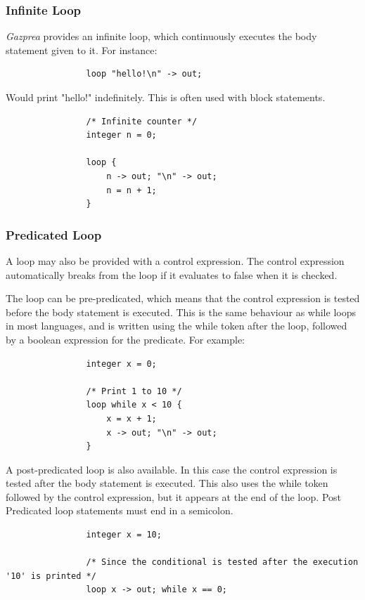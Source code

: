 \documentclass{article}
\begin{document}
		\subsubsection{Infinite Loop}\label{sec:infLoop}
			\textit{Gazprea} provides an infinite loop, which continuously executes the body statement given to it. For
			instance:

			\begin{lstlisting}
				loop "hello!\n" -> out;
			\end{lstlisting}

			Would print "hello!" indefinitely. This is often used with block statements.

			\begin{lstlisting}
				/* Infinite counter */
				integer n = 0;

				loop {
					n -> out; "\n" -> out;
					n = n + 1;
				}
			\end{lstlisting}

		\subsubsection{Predicated Loop}\label{sec:predicatedLoop}

			A loop may also be provided with a control expression. The control expression automatically breaks from the
			loop if it evaluates to false when it is checked.

			The loop can be pre-predicated, which means that the control expression is tested before the body statement
			is executed. This is the same behaviour as while loops in most languages, and is written using the while
			token after the loop, followed by a boolean expression for the predicate. For example:

			\begin{lstlisting}
				integer x = 0;

				/* Print 1 to 10 */
				loop while x < 10 {
					x = x + 1;
					x -> out; "\n" -> out;
				}
			\end{lstlisting}

			A post-predicated loop is also available. In this case the control expression is tested after the body
			statement is executed. This also uses the while token followed by the control expression, but it appears at
			the end of the loop. Post Predicated loop statements must end in a semicolon.

			\begin{lstlisting}
				integer x = 10;

				/* Since the conditional is tested after the execution '10' is printed */
				loop x -> out; while x == 0;
			\end{lstlisting}
\end{document}
